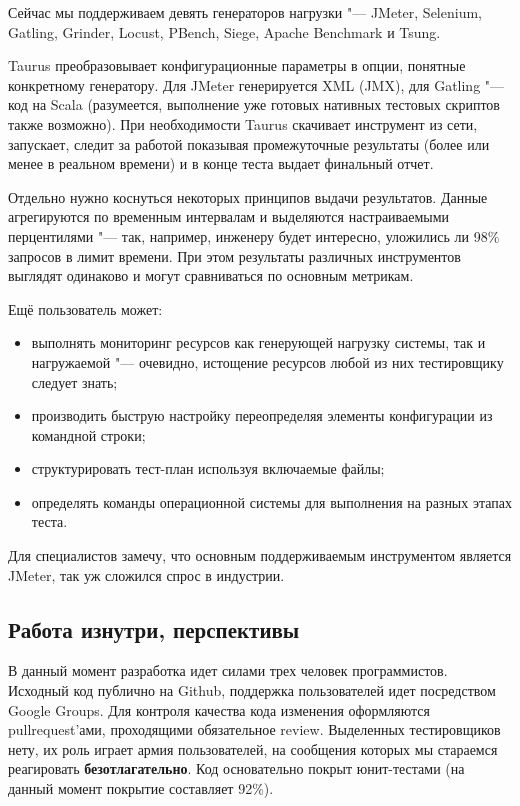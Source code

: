 \documentclass[10pt, a5paper]{article}
\begin{document}
Сейчас мы поддерживаем девять генераторов нагрузки "--- JMeter, Selenium, Gatling, Grinder, Locust, PBench, Siege, Apache Benchmark и Tsung.

Taurus преобразовывает конфигурационные параметры в опции, понятные конкретному генератору. Для JMeter генерируется XML (JMX), для Gatling "--- код на Scala (разумеется, выполнение уже готовых нативных тестовых скриптов также возможно). При необходимости Taurus скачивает инструмент из сети, запускает, следит за работой показывая промежуточные результаты (более или менее в реальном времени) и в конце теста выдает финальный отчет.

Отдельно нужно коснуться некоторых принципов выдачи результатов. 
Данные агрегируются по временным интервалам и выделяются настраиваемыми перцентилями "--- так, например, инженеру будет интересно, уложились ли 98\% запросов в лимит времени. При этом результаты различных инструментов выглядят одинаково и могут сравниваться по основным метрикам.

Ещё пользователь может:

\begin{itemize}
  \item выполнять мониторинг ресурсов как генерующей нагрузку системы, так и нагружаемой "--- очевидно, истощение ресурсов любой из них тестировщику следует знать;
  \item производить быструю настройку переопределяя элементы конфигурации из командной строки;
  \item структурировать тест-план используя включаемые файлы;
  \item определять команды операционной системы для выполнения на разных этапах теста.
\end{itemize}

Для специалистов замечу, что основным поддерживаемым инструментом является JMeter, так уж сложился спрос в индустрии.

\subsection*{Работа изнутри, перспективы}

В данный момент разработка идет силами трех человек программистов. Исходный код публично на Github, поддержка пользователей идет посредством Google Groups. Для контроля качества кода изменения оформляются pullrequest’ами, проходящими обязательное review. Выделенных тестировщиков нету, их роль играет армия пользователей, на сообщения которых мы стараемся реагировать \textbf{безотлагательно}. 
Код основательно покрыт юнит-тестами (на данный момент покрытие составляет 92\%).
\end{document}
